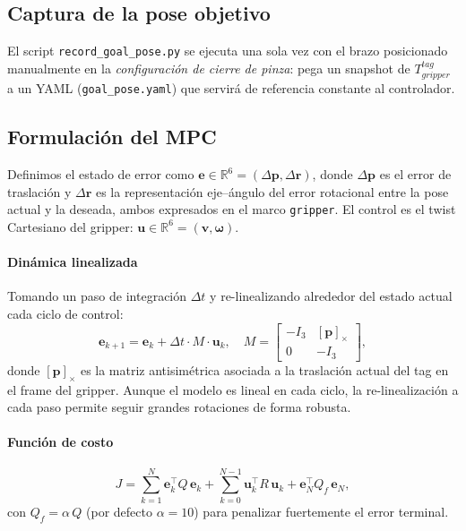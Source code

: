 \documentclass[conference]{IEEEtran}
\begin{document}
\subsection{Captura de la pose objetivo}

El script \texttt{record\_goal\_pose.py} se ejecuta una sola vez con
el brazo posicionado manualmente en la \emph{configuraci\'on de cierre
de pinza}: pega un snapshot de
$T_{gripper}^{tag}$ a un YAML
(\texttt{goal\_pose.yaml}) que servir\'a de referencia constante al
controlador.

\subsection{Formulaci\'on del MPC}

Definimos el estado de error como
$\mathbf{e}\in\mathbb{R}^6 = (\Delta\mathbf{p}, \Delta\mathbf{r})$,
donde $\Delta\mathbf{p}$ es el error de traslaci\'on y
$\Delta\mathbf{r}$ es la representaci\'on eje--\'angulo del error
rotacional entre la pose actual y la deseada, ambos expresados en el
marco \texttt{gripper}. El control es el twist Cartesiano del gripper:
$\mathbf{u}\in\mathbb{R}^6 = (\mathbf{v}, \boldsymbol{\omega})$.

\paragraph*{Din\'amica linealizada} Tomando un paso de integraci\'on
$\Delta t$ y re-linealizando alrededor del estado actual cada ciclo
de control:
\begin{equation}
\mathbf{e}_{k+1} = \mathbf{e}_k + \Delta t \cdot M \cdot \mathbf{u}_k,
\quad
M = \begin{bmatrix} -I_3 & [\mathbf{p}]_\times \\ 0 & -I_3 \end{bmatrix},
\label{eq:dynamics}
\end{equation}
donde $[\mathbf{p}]_\times$ es la matriz antisim\'etrica asociada a
la traslaci\'on actual del tag en el frame del gripper. Aunque el
modelo es lineal en cada ciclo, la re-linealizaci\'on a cada paso
permite seguir grandes rotaciones de forma robusta.

\paragraph*{Funci\'on de costo}
\begin{equation}
J = \sum_{k=1}^{N} \mathbf{e}_k^\top Q\, \mathbf{e}_k
  + \sum_{k=0}^{N-1} \mathbf{u}_k^\top R\, \mathbf{u}_k
  + \mathbf{e}_N^\top Q_f\, \mathbf{e}_N,
\label{eq:cost}
\end{equation}
con $Q_f = \alpha\,Q$ (por defecto $\alpha=10$) para penalizar
fuertemente el error terminal.
\end{document}
